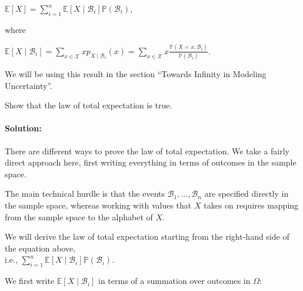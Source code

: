\documentclass[6008notes.tex]{subfiles}
\begin{document}
{\centering$\mathbb {E}[X]=\sum _{i=1}^{n}\mathbb {E}[X\mid \mathcal{B}_{i}]\mathbb {P}(\mathcal{B}_{i}),$ \par}
 
where

{\centering$\mathbb {E}[X\mid \mathcal{B}_{i}] = \sum _{x\in \mathcal{X}}xp_{X\mid \mathcal{B}_{i}}(x) = \sum _{x\in \mathcal{X}}x\frac{\mathbb {P}(X=x,\mathcal{B}_{i})}{\mathbb {P}(\mathcal{B}_{i})}.$ \par}
 
We will be using this result in the section ``Towards Infinity in Modeling Uncertainty''.

Show that the law of total expectation is true.

\paragraph{Solution:} There are different ways to prove the law of total expectation. We take a fairly direct approach here, first writing everything in terms of outcomes in the sample space.

The main technical hurdle is that the events $\mathcal{B}_{1},\dots ,\mathcal{B}_{n}$ are specified directly in the sample space, whereas working with values that $X$ takes on requires mapping from the sample space to the alphabet of $X$.

We will derive the law of total expectation starting from the right-hand side of the equation above, \\ i.e., $\sum _{i=1}^{n}\mathbb {E}[X\mid \mathcal{B}_{i}]\mathbb {P}(\mathcal{B}_{i})$.

We first write $\mathbb {E}[X\mid \mathcal{B}_{i}]$ in terms of a summation over outcomes in $\Omega$:
\end{document}
